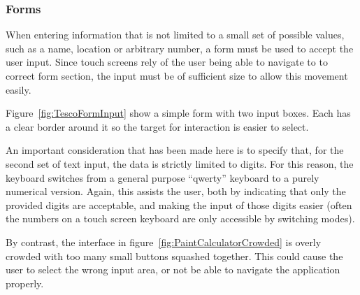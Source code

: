 
\subsubsection{Forms}
\label{ssub:forms}

When entering information that is not limited to a small set of possible
values, such as a name, location or arbitrary number, a form must be used to
accept the user input. Since touch screens rely of the user being able to
navigate to to correct form section, the input must be of sufficient size to
allow this movement easily.

Figure~\ref{fig:TescoFormInput} show a simple form with two input boxes. Each
has a clear border around it so the target for interaction is easier to select.

An important consideration that has been made here is to specify that, for the
second set of text input, the data is strictly limited to digits. For this
reason, the keyboard switches from a general purpose ``qwerty'' keyboard to a
purely numerical version. Again, this assists the user, both by indicating that
only the provided digits are acceptable, and making the input of those digits
easier (often the numbers on a touch screen keyboard are only accessible by
switching modes).


By contrast, the interface in figure~\ref{fig:PaintCalculatorCrowded} is overly
crowded with too many small buttons squashed together. This could cause the
user to select the wrong input area, or not be able to navigate the application
properly.

